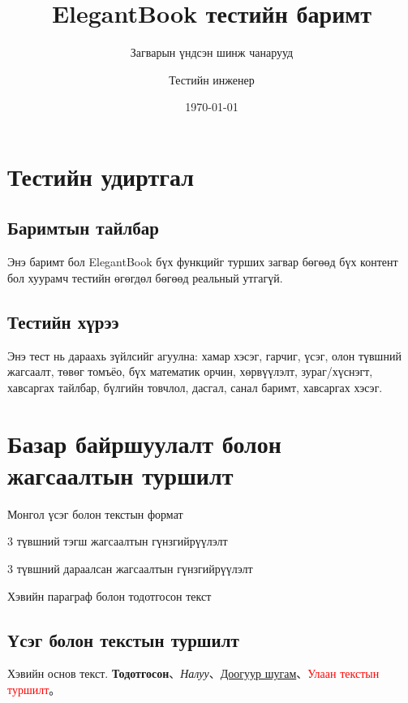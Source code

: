 \documentclass[nm]{../../elegantbook}
\title{ElegantBook тестийн баримт}
\subtitle{Загварын үндсэн шинж чанарууд}
\author{Тестийн инженер}
\institute{Загварын тестийн баг}
\date{\today}
\begin{document}
\maketitle
\frontmatter
\tableofcontents

\setcounter{page}{0}
\chapter*{Тестийн удиртгал}
\section*{Баримтын тайлбар}
Энэ баримт бол ElegantBook бүх функцийг турших загвар бөгөөд бүх контент бол хуурамч тестийн өгөгдөл бөгөөд реальный утгагүй.
\newpage
\section*{Тестийн хүрээ}
Энэ тест нь дараахь зүйлсийг агуулна: хамар хэсэг, гарчиг, үсэг, олон түвшний жагсаалт, төвөг томъёо, бүх математик орчин, хөрвүүлэлт, зураг/хүснэгт, хавсаргах тайлбар, бүлгийн товчлол, дасгал, санал баримт, хавсаргах хэсэг.

\mainmatter

\chapter{Базар байршуулалт болон жагсаалтын туршилт}
\begin{introduction}
\item Монгол үсэг болон текстын формат
\item 3 түвшний тэгш жагсаалтын гүнзгийрүүлэлт
\item 3 түвшний дараалсан жагсаалтын гүнзгийрүүлэлт
\item Хэвийн параграф болон тодотгосон текст
\end{introduction}

\section{Үсэг болон текстын туршилт}
Хэвийн основ текст. \textbf{Тодотгосон}、\textit{Налуу}、\underline{Доогуур шугам}、\textcolor{red}{Улаан текстын туршилт}。
\end{document}
